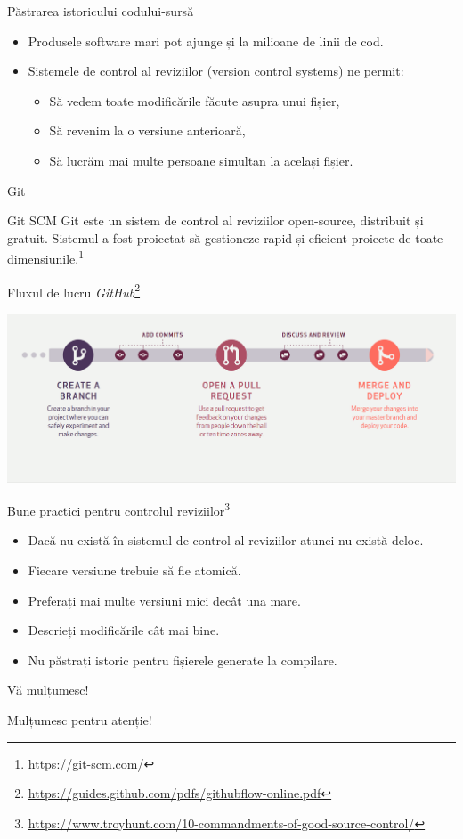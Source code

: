 \documentclass[presentation]{beamer}
\begin{document}
\begin{frame}[label={sec:org0ca6b1e}]{Păstrarea istoricului codului-sursă}
\begin{itemize}
\item Produsele software mari pot ajunge și la milioane de linii de cod.
\item Sistemele de control al reviziilor (version control systems) ne permit:
\begin{itemize}
\item Să vedem toate modificările făcute asupra unui fișier,
\item Să revenim la o versiune anterioară,
\item Să lucrăm mai multe persoane simultan la același fișier.
\end{itemize}
\end{itemize}
\end{frame}
\begin{frame}[label={sec:orgce31a22}]{Git}
\begin{block}{Git SCM}
Git este un sistem de control al reviziilor open-source, distribuit și gratuit. Sistemul a fost proiectat să gestioneze rapid și eficient proiecte de toate dimensiunile.\footnote{\url{https://git-scm.com/}}
\end{block}
\end{frame}
\begin{frame}[label={sec:org663d3e5}]{Fluxul de lucru \emph{GitHub}\footnote{\url{https://guides.github.com/pdfs/githubflow-online.pdf}}}
\begin{center}
\includegraphics[width=\textwidth]{img/github-flow.png}
\end{center}
\end{frame}
\begin{frame}[label={sec:org551c053}]{Bune practici pentru controlul reviziilor\footnote{\url{https://www.troyhunt.com/10-commandments-of-good-source-control/}}}
\begin{itemize}
\item Dacă nu există în sistemul de control al reviziilor atunci nu există deloc.
\item Fiecare versiune trebuie să fie atomică.
\item Preferați mai multe versiuni mici decât una mare.
\item Descrieți modificările cât mai bine.
\item Nu păstrați istoric pentru fișierele generate la compilare.
\end{itemize}
\end{frame}
\begin{frame}[label={sec:org143ddf6}]{Vă mulțumesc!}
\begin{center}
Mulțumesc pentru atenție!
\end{center}
\end{frame}
\end{document}
